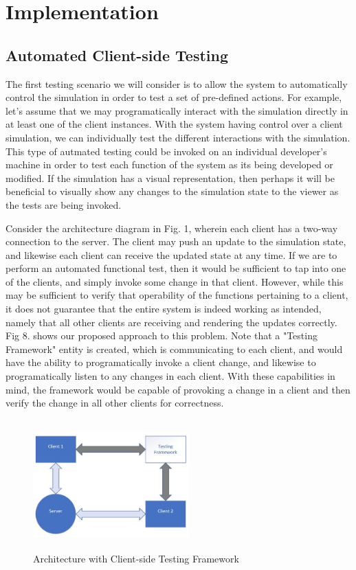 \documentclass[conference]{IEEEtran}
\begin{document}
\section{Implementation}


\subsection{Automated Client-side Testing}

The first testing scenario we will consider is to allow the system to automatically control the simulation in order to test a set of pre-defined actions.
For example, let's assume that we may programatically interact with the simulation directly in at least one of the client instances. With the system having control over a client simulation, 
we can individually test the different interactions with the simulation. This type of autmated testing could be invoked on an individual developer's 
machine in order to test each function of the system as its being developed or modified. If the simulation has a visual representation, then perhaps it will be beneficial to 
visually show any changes to the simulation state to the viewer as the tests are being invoked.  

Consider the architecture diagram in Fig. 1, wherein each client has a two-way connection to the server. The client may push an update to the simulation state, and likewise each
client can receive the updated state at any time. If we are to perform an automated functional test, then it would be sufficient to tap into one of the clients, and simply invoke 
some change in that client. However, while this may be sufficient to verify that operability of the functions pertaining to a client, it does not guarantee that the entire system 
is indeed working as intended, namely that all other clients are receiving and rendering the updates correctly. Fig 8. shows our proposed approach to this problem. Note that a "Testing Framework"
entity is created, which is communicating to each client, and would have the ability to programatically invoke a client change, and likewise to programatically listen to any changes in each client.
With these capabilities in mind, the framework would be capable of provoking a change in a client and then verify the change in all other clients for correctness. 


\begin{figure}[htbp]
\centerline{\includegraphics [width = 6cm, height = 5cm] {images/ClientSideFrameworkDiagram.jpg}}
\caption{Architecture with Client-side Testing Framework}
\end{figure}
\end{document}
